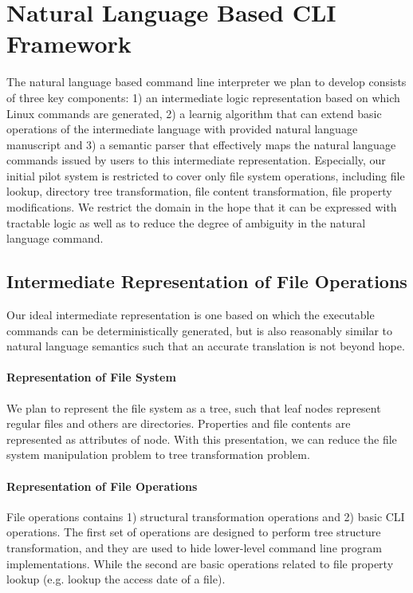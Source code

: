 
\section{Natural Language Based CLI Framework}

The natural language based command line interpreter we plan to develop consists of three key components: 1) an intermediate logic representation based on which Linux commands are generated, 2) a learnig algorithm that can extend basic operations of the intermediate language with provided natural language manuscript and 3) a semantic parser that effectively maps the natural language commands issued by users to this intermediate representation. Especially, our initial pilot system is restricted to cover only file system operations, including file lookup, directory tree transformation, file content transformation, file property modifications. We restrict the domain in the hope that it can be expressed with tractable logic as well as to reduce the degree of ambiguity in the natural language command.

\subsection{Intermediate Representation of File Operations}
\label{subsec:represent}
Our ideal intermediate representation is one based on which the executable commands can be deterministically generated, but is also reasonably similar to natural language semantics such that an accurate translation is not beyond hope.
\paragraph{Representation of File System}
We plan to represent the file system as a tree, such that leaf nodes represent regular files and others are directories. Properties and file contents are represented as attributes of node. With this presentation, we can reduce the file system manipulation problem to tree transformation problem.
\paragraph{Representation of File Operations}
File operations contains 1) structural transformation operations and 2) basic CLI operations. The first set of operations are designed to perform tree structure transformation, and they are used to hide lower-level command line program implementations. While the second are basic operations related to file property lookup (e.g. lookup the access date of a file).

